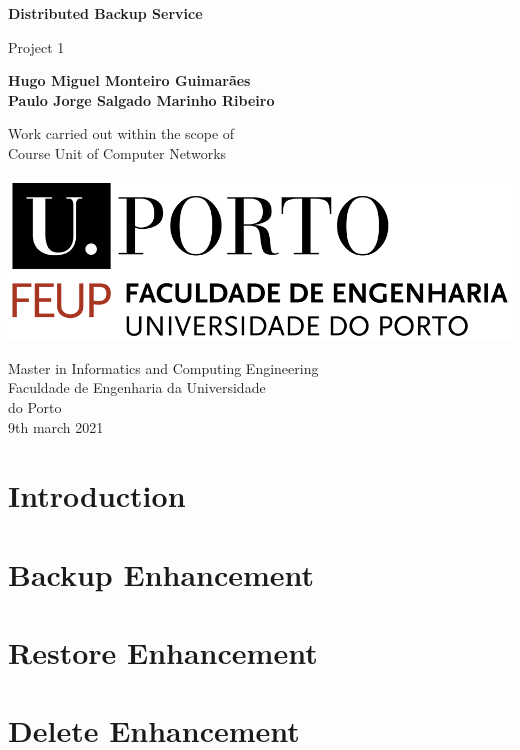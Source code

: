 \documentclass[11pt]{article}
\begin{document}
\begin{titlepage}
	\begin{center}
		\vspace*{1cm}
		
		\Large
		\textbf{Distributed Backup Service}
		
		\vspace{0.5cm}
		\large
		Project 1 
		
		\vspace{1.5cm}
		
		\textbf{Hugo Miguel Monteiro Guimarães}\\
		\textbf{Paulo Jorge Salgado Marinho Ribeiro}
		
		\vspace{4cm}
		
		Work carried out within the scope of \\
		Course Unit of Computer Networks
		
		\vspace{0.8cm}
		
		\includegraphics[width=0.4 \textwidth]{feup_logo.png}
		
		\vspace{1.5cm}		
		
		\large
		Master in Informatics and Computing Engineering\\
		Faculdade de Engenharia da Universidade\\
		do Porto\\
		9th march 2021
	
	\end{center}
\end{titlepage}


\pagebreak
\tableofcontents

\pagebreak

\section*{Introduction}


\section{Backup Enhancement}


\section{Restore Enhancement}



\section{Delete Enhancement}






	
\end{document}

